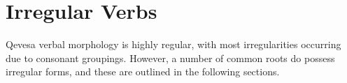 \documentclass[grammar]{subfiles}
\begin{document}
%
%
%
%
%
%
%
%
  \section{Irregular Verbs}
  \label{sec:vm_irregular}

  Qevesa verbal morphology is highly regular, with most irregularities occurring due to consonant groupings. %
  However, a number of common roots do possess irregular forms, and these are outlined in the following sections.
  
  \ToBeWritten
\end{document}
